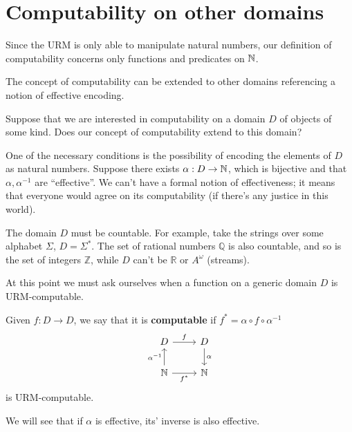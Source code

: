 \chapter{Computability on other domains}

Since the URM is only able to manipulate natural numbers, our definition of computability concerns only functions and predicates on $\mathbb{N}$.

The concept of computability can be extended to other domains referencing a notion of effective encoding.

Suppose that we are interested in computability on a  domain $D$ of objects of some kind. 
Does our concept of computability extend to this domain? 

One of the necessary conditions is the possibility of encoding the elements of $D$ as natural numbers. 
Suppose there exists $\alpha: D \rightarrow \mathbb{N}$, which is bijective and that $\alpha, \alpha^{-1}$ are ``effective''. 
We can't have a formal notion of effectiveness; it means that everyone would agree on its computability (if there's any justice in this world).

The domain $D$ must be countable. For example, take the strings over some alphabet $\Sigma$, $D = \Sigma^*$. 
The set of rational numbers $\mathbb{Q}$ is also countable, and so is the set of integers $\mathbb{Z}$, while $D$ can't be  $\mathbb{R}$ or $A^\omega$ (streams).

At this point we must ask ourselves when a function on a generic domain $D$ is URM-computable. 

\begin{definition}
  Given $f: D \rightarrow D$, we say that it is \textbf{computable} if $ f^* = \alpha \circ f \circ \alpha^{-1}$
  \[\begin{tikzcd}
    D & D \\
    \nat & \nat
    \arrow["{\alpha^{-1}}", from=2-1, to=1-1]
    \arrow["f", from=1-1, to=1-2]
    \arrow["\alpha", from=1-2, to=2-2]
    \arrow["{f^*}"', from=2-1, to=2-2]
  \end{tikzcd}\]
  is URM-computable.
\end{definition}

We will see that if $\alpha$ is effective, its' inverse is also effective.

